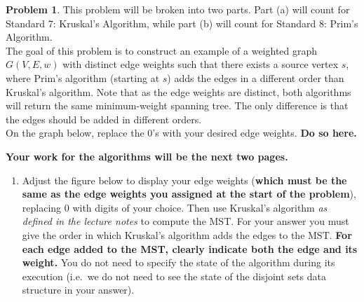 \documentclass[11pt]{article}
\theoremstyle{definition}
\theoremstyle{definition}
\newtheorem{required}{Problem}
\theoremstyle{definition}
\begin{document}
\begin{required}
This problem will be broken into two parts. Part (a) will count for Standard 7: Kruskal's Algorithm, while part (b) will count for Standard 8: Prim's Algorithm. \\

\noindent The goal of this problem is to construct an example of a weighted graph $G(V, E, w)$ with distinct edge weights such that there exists a source vertex $s$, where Prim's algorithm (starting at $s$) adds the edges in a different order than Kruskal's algorithm. Note that as the edge weights are distinct, both algorithms will return the same minimum-weight spanning tree. The only difference is that the edges should be added in different orders. \\

\noindent On the graph below, replace the $0$'s with your desired edge weights. \textbf{Do so here.}
\begin{center}
\end{center}


\noindent \textbf{Your work for the algorithms will be the next two pages.}

\newpage
\begin{enumerate}[label=(\alph*)]
\subsection{Standard 7: Kruskal's Algorithm}
\item Adjust the figure below to display your edge weights (\textbf{which must be the same as the edge weights you assigned at the start of the problem}), replacing 0 with digits of your choice. Then use Kruskal's algorithm \emph{as defined in the lecture notes} to compute the MST\@. For your answer you must give the order in which Kruskal's algorithm adds the edges to the MST\@.  \textbf{For each edge added to the MST, clearly indicate both the edge and its weight.} You do not need to specify the state of the algorithm during its execution (i.e.\ we do not need to see the state of the disjoint sets data structure in your answer).


\end{enumerate}
\end{required}
\end{document}
